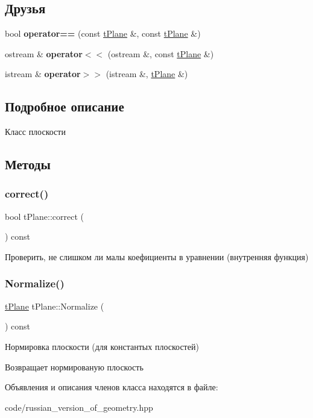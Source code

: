 \subsection*{Друзья}
\begin{DoxyCompactItemize}
\item 
\mbox{\label{classtPlane_a6451041e9d6964bdee537cfbbb12b661}} 
bool {\bfseries operator==} (const \hyperlink{classtPlane}{t\+Plane} \&, const \hyperlink{classtPlane}{t\+Plane} \&)
\item 
\mbox{\label{classtPlane_a17e0e9cf17cafb43cdcd42e043267101}} 
ostream \& {\bfseries operator$<$$<$} (ostream \&, const \hyperlink{classtPlane}{t\+Plane} \&)
\item 
\mbox{\label{classtPlane_aee7595b1119f9dea39ba0c12dc8c4dc3}} 
istream \& {\bfseries operator$>$$>$} (istream \&, \hyperlink{classtPlane}{t\+Plane} \&)
\end{DoxyCompactItemize}


\subsection{Подробное описание}
Класс плоскости 

\subsection{Методы}
\mbox{\label{classtPlane_a382974c179a2bac3eb2da1d18c4dd860}} 
\subsubsection{\texorpdfstring{correct()}{correct()}}
{\footnotesize\ttfamily bool t\+Plane\+::correct (\begin{DoxyParamCaption}{ }\end{DoxyParamCaption}) const}

Проверить, не слишком ли малы коефициенты в уравнении (внутренняя функция) \mbox{\label{classtPlane_a8957e329f01270932a9a5b73ee9fe33a}} 
\subsubsection{\texorpdfstring{Normalize()}{Normalize()}}
{\footnotesize\ttfamily \hyperlink{classtPlane}{t\+Plane} t\+Plane\+::\+Normalize (\begin{DoxyParamCaption}{ }\end{DoxyParamCaption}) const}

Нормировка плоскости (для константых плоскостей) \begin{DoxyReturn}{Возвращает}
нормированую плоскость 
\end{DoxyReturn}


Объявления и описания членов класса находятся в файле\+:\begin{DoxyCompactItemize}
\item 
code/russian\+\_\+version\+\_\+of\+\_\+geometry.\+hpp\end{DoxyCompactItemize}
